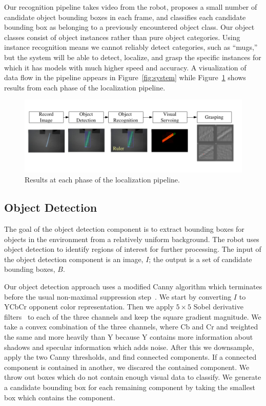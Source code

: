 \documentclass[graybox]{svmult}
\begin{document}
Our recognition pipeline takes video from the robot, proposes a small
number of candidate object bounding boxes in each frame, and
classifies each candidate bounding box as belonging to a previously
encountered object class. Our object classes consist of object
instances rather than pure object categories.  Using instance
recognition means we cannot reliably detect categories, such as
``mugs,'' but the system will be able to detect, localize, and grasp
the specific instances for which it has models with much higher speed
and accuracy.  A visualization of data flow in the pipeline appears in
Figure~\ref{fig:system} while Figure~\ref{fig:images} shows results
from each phase of the localization pipeline.  
\begin{figure}
\includegraphics{figures/system.pdf}
\caption{Results at each phase of the localization pipeline.\label{fig:images}}
\end{figure}


\subsection{Object Detection}
\label{sec:detection}

The goal of the object detection component is to extract bounding
boxes for objects in the environment from a relatively uniform
background.  The robot uses object detection to identify regions of
interest for further processing.  The input of the object detection
component is an image, $I$; the output is a set of candidate bounding
boxes, $B$.  

Our object detection approach uses a modified Canny algorithm which
terminates before the usual non-maximal suppression
step~\citep{canny86}.  We start by converting $I$ to YCbCr opponent
color representation.  Then we apply $5 \times 5$ Sobel derivative
filters~\citep{sobel95} to each of the three channels and keep the
square gradient magnitude. We take a convex combination of the three
channels, where Cb and Cr and weighted the same and more heavily than
Y because Y contains more information about shadows and specular
information which adds noise.  After this we downsample, apply the two
Canny thresholds, and find connected components.  If a connected
component is contained in another, we discared the contained
component.  We throw out boxes which do not contain enough visual data
to classify.  We generate a candidate bounding box for each remaining
component by taking the smallest box which contains the component.
\end{document}

